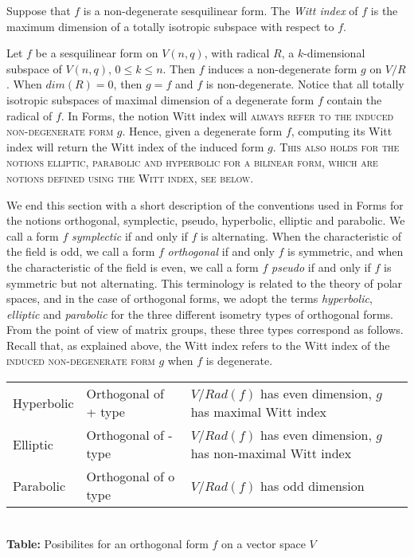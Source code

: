 \documentclass[a4paper,11pt]{report}
\begin{document}
{{Suppose that $f$ is a non-degenerate sesquilinear form. The \emph{Witt index} of $f$ is the maximum dimension of a totally isotropic subspace with respect to $f$. 

 Let $f$ be a sesquilinear form on $V(n,q)$, with radical $R$, a $k$-dimensional subspace of $V(n,q)$, $0 \leq k \leq n$. Then $f$ induces a non-degenerate form $g$ on $V/R$. When $dim(R)=0$, then $g=f$ and $f$ is non-degenerate. Notice that all totally isotropic subspaces of maximal
dimension of a degenerate form $f$ contain the radical of $f$. In \textsf{Forms}, the notion Witt index will \textsc{always refer to the induced non-degenerate form} $g$. Hence, given a degenerate form $f$, computing its Witt index will return the Witt index of the induced form $g$. \textsc{This also holds for the notions elliptic, parabolic and hyperbolic for a
bilinear form, which are notions defined using the Witt index, see below}. 

 We end this section with a short description of the conventions used in \textsf{Forms} for the notions orthogonal, symplectic, pseudo, hyperbolic, elliptic and
parabolic. We call a form $f$ \emph{symplectic} if and only if $f$ is alternating. When the characteristic of the field is odd, we call a form $f$ \emph{orthogonal} if and only $f$ is symmetric, and when the characteristic of the field is even, we call a form $f$ \emph{pseudo} if and only if $f$ is symmetric but not alternating. This terminology is related to the theory of
polar spaces, and in the case of orthogonal forms, we adopt the terms \emph{hyperbolic}, \emph{elliptic} and \emph{parabolic} for the three different isometry types of orthogonal forms. From the point of
view of matrix groups, these three types correspond as follows. Recall that,
as explained above, the Witt index refers to the Witt index of the \textsc{induced non-degenerate form} $g$ when $f$ is degenerate. \begin{center}
\begin{tabular}{l|l|l}\hline
Hyperbolic&
Orthogonal of + type&
$V/Rad(f)$ has even dimension, $g$ has maximal Witt index\\
Elliptic&
Orthogonal of - type&
$V/Rad(f)$ has even dimension, $g$ has non-maximal Witt index\\
Parabolic&
Orthogonal of o type&
$V/Rad(f)$ has odd dimension\\
\hline
\end{tabular}\\[2mm]
\textbf{Table: }Posibilites for an orthogonal form $f$ on a vector space $V$\end{center}

}}
\end{document}
